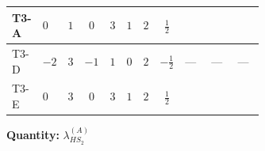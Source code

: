 \documentclass[8pt]{article}
\begin{document}
\begin{landscape}
\begin{longtable}{@{}llcccccc >{\raggedright\arraybackslash}p{0.21\linewidth} >{\raggedright\arraybackslash}p{0.21\linewidth} >{\raggedright\arraybackslash}p{0.21\linewidth}@{}}
\midrule
T3-A & $0$ & $1$ & $0$ & $3$ & $1$ & $2$ & $\frac{1}{2}$ & \scriptsize\adjustbox{max width=\linewidth}{$\begin{gathered} +8 {\lambda_{HS_2}^{(1)}} {\lambda_{HS_2}^{(A)}}\end{gathered}$} & \scriptsize\adjustbox{max width=\linewidth}{$\begin{gathered} +2 {\lambda_{HS_2}^{(A)}} {\lambda_{S_2}^{(1)}}\end{gathered}$} & \scriptsize\adjustbox{max width=\linewidth}{$\begin{gathered} {\lambda_{HS_2}^{(A)}} (6 \operatorname{Tr}\!\left({Y_d}\,\left({Y_d}\right)^{\dagger}\right)+2 \operatorname{Tr}\!\left({Y_e}\,\left({Y_e}\right)^{\dagger}\right)+6 \operatorname{Tr}\!\left({Y_u}\,\left({Y_u}\right)^{\dagger}\right)+16 {\lambda_{S_2}^{(A)}})\end{gathered}$} \\
\midrule
T3-D & $-2$ & $3$ & $-1$ & $1$ & $0$ & $2$ & $-\frac{1}{2}$ & --- & --- & --- \\
\midrule
T3-E & $0$ & $3$ & $0$ & $3$ & $1$ & $2$ & $\frac{1}{2}$ & \scriptsize\adjustbox{max width=\linewidth}{$\begin{gathered} +8 {\lambda_{HS_2}^{(1)}} {\lambda_{HS_2}^{(A)}}\end{gathered}$} & \scriptsize\adjustbox{max width=\linewidth}{$\begin{gathered} +2 {\lambda_{HS_2}^{(A)}} {\lambda_{S_2}^{(1)}}\end{gathered}$} & \scriptsize\adjustbox{max width=\linewidth}{$\begin{gathered} {\lambda_{HS_2}^{(A)}} (6 \operatorname{Tr}\!\left({Y_d}\,\left({Y_d}\right)^{\dagger}\right)+2 \operatorname{Tr}\!\left({Y_e}\,\left({Y_e}\right)^{\dagger}\right)+6 \operatorname{Tr}\!\left({Y_u}\,\left({Y_u}\right)^{\dagger}\right)+16 {\lambda_{S_2}^{(A)}})\end{gathered}$} \\
\midrule
\bottomrule
\end{longtable}
\clearpage
\noindent\textbf{Quantity: }$\lambda_{HS_2}^{(A)}$\par\smallskip

\end{landscape}
\end{document}
